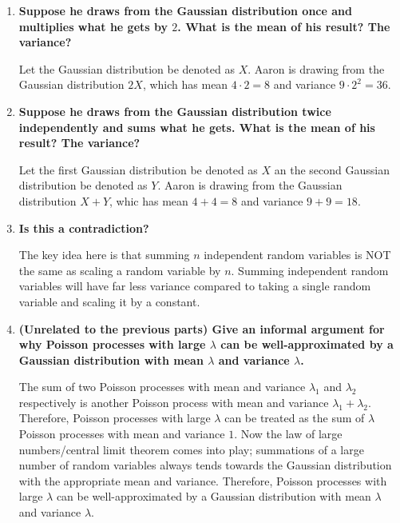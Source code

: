 \documentclass{article}
\begin{document}
\begin{enumerate}[label=(\alph*)]
    \item \textbf{Suppose he draws from the Gaussian distribution once and multiplies what he gets by $2$. What is the mean of his result? The variance?}

    Let the Gaussian distribution be denoted as $X$. Aaron is drawing from the Gaussian distribution $2X$, which has mean $4 \cdot 2 = 8$ and variance $9 \cdot 2^2 = 36$.

    \vfill

    \item \textbf{Suppose he draws from the Gaussian distribution twice independently and sums what he gets. What is the mean of his result? The variance?}

    Let the first Gaussian distribution be denoted as $X$ an the second Gaussian distribution be denoted as $Y$. Aaron is drawing from the Gaussian distribution $X + Y$, whic has mean $4 + 4 = 8$ and variance $9 + 9 = 18$.

    \vfill

    \item \textbf{Is this a contradiction?}

    The key idea here is that summing $n$ independent random variables is NOT the same as scaling a random variable by $n$. Summing independent random variables will have far less variance compared to taking a single random variable and scaling it by a constant.

    \vfill

    \item \textbf{(Unrelated to the previous parts) Give an informal argument for why Poisson processes with large $\lambda$ can be well-approximated by a Gaussian distribution with mean $\lambda$ and variance $\lambda$.}

    The sum of two Poisson processes with mean and variance $\lambda_1$ and $\lambda_2$ respectively is another Poisson process with mean and variance $\lambda_1 + \lambda_2$. Therefore, Poisson processes with large $\lambda$ can be treated as the sum of $\lambda$ Poisson processes with mean and variance $1$. Now the law of large numbers/central limit theorem comes into play; summations of a large number of random variables always tends towards the Gaussian distribution with the appropriate mean and variance. Therefore, Poisson processes with large $\lambda$ can be well-approximated by a Gaussian distribution with mean $\lambda$ and variance $\lambda$.
\end{enumerate}
\end{document}
